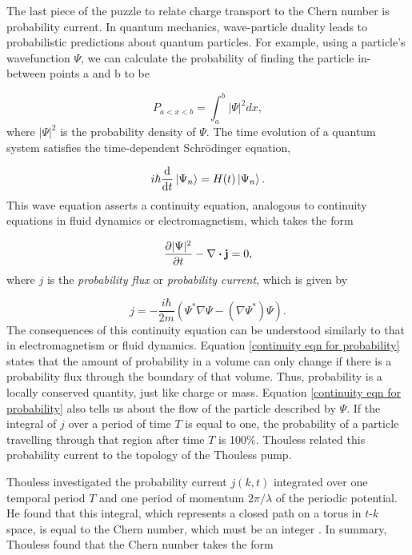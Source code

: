 \documentclass[double,12pt,1in,seploa]{beavtex}
\begin{document}
The last piece of the puzzle to relate charge transport to the Chern number is probability current. In quantum mechanics, wave-particle duality leads to probabilistic predictions about quantum particles. For example, using a particle's wavefunction $\Psi$, we can calculate the probability of finding the particle in-between points a and b to be 

\begin{equation}
    P_{a<x<b} = \int_{a}^{b} |\Psi|^2dx,
\end{equation}
where $|\Psi|^2$ is the probability density of $\Psi$. The time evolution of a quantum system satisfies the time-dependent Schrödinger equation,

\begin{equation}
    i \hbar \derivative{t}\ket{\Psi_n} = H(t)\ket{\Psi_n}.
\end{equation}
This wave equation asserts a continuity equation, analogous to continuity equations in fluid dynamics or electromagnetism, which takes the form \cite{sakurai_modern_1985}

\begin{equation}
    \pdv{|\Psi|^2}{t} -\nabla \dotproduct \vectorbold{j} = 0, \label{continuity eqn for probability}
\end{equation}
where $j$ is the \textit{probability flux} or \textit{probability current}, which is given by

\begin{equation}
    j = -\frac{i \hbar}{2 m}\left(\Psi^* \nabla \Psi - (\nabla \Psi^*)\Psi\right). 
\end{equation}
The consequences of this continuity equation can be understood similarly to that in electromagnetism or fluid dynamics. Equation \ref{continuity eqn for probability} states that the amount of probability in a volume can only change if there is a probability flux through the boundary of that volume. Thus, probability is a locally conserved quantity, just like charge or mass. Equation \ref{continuity eqn for probability} also tells us about the flow of the particle described by $\Psi$. If the integral of $j$ over a period of time $T$ is equal to one, the probability of a particle travelling through that region after time $T$ is 100\%. Thouless related this probability current to the topology of the Thouless pump.

Thouless investigated the probability current $j(k,t)$ integrated over one temporal period $T$ and one period of momentum $2\pi/\lambda$ of the periodic potential. He found that this integral, which represents a closed path on a torus in $t \textrm{-} k$ space, is equal to the Chern number, which must be an integer \cite{thouless_quantization_1983}. In summary, Thouless found that the Chern number takes the form
\end{document}
